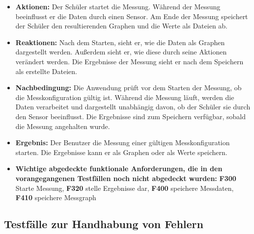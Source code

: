 \documentclass[parskip=full]{scrartcl}
\begin{document}
\begin{description}
\begin{itemize}
\item []\textbf{Aktionen:} Der Schüler startet die Messung. Während der Messung beeinflusst er die Daten durch einen Sensor. Am Ende der Messung speichert der Schüler den resultierenden Graphen und die Werte als Dateien ab.
\item []\textbf{Reaktionen:} Nach dem Starten, sieht er, wie die Daten als Graphen dargestellt werden. Außerdem sieht er, wie diese durch seine Aktionen verändert werden. Die Ergebnisse der Messung sieht er nach dem Speichern als erstellte Dateien.
\item []\textbf{Nachbedingung:} Die Anwendung prüft vor dem Starten der Messung, ob die Messkonfiguration gültig ist. Während die Messung läuft, werden die Daten verarbeitet und dargestellt unabhängig davon, ob der Schüler sie durch den Sensor beeinflusst. Die Ergebnisse sind zum Speichern verfügbar, sobald die Messung angehalten wurde.


\item []\textbf{Ergebnis:} Der Benutzer die Messung einer gültigen Messkonfiguration starten. Die Ergebnisse kann er als Graphen oder als Werte speichern. 
\item []\textbf{Wichtige abgedeckte funktionale Anforderungen, die in den vorangegangenen Testfällen noch nicht abgedeckt wurden:} \textbf{F300} Starte Messung, \textbf{F320} stelle Ergebnisse dar, \textbf{F400} speichere Messdaten, \textbf{F410} speichere Messgraph


\end{itemize}
\end{description}

\subsection{Testfälle zur Handhabung von Fehlern}
\end{document}
